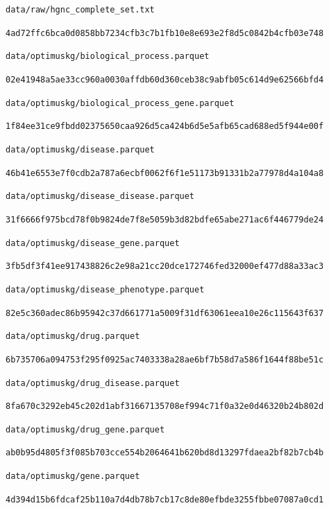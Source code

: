 \documentclass[10pt,a4paper]{article}
\begin{document}
\begingroup\footnotesize
\noindent\nolinkurl{data/raw/hgnc_complete_set.txt}\par
\noindent\texttt{4ad72ffc6bca0d0858bb7234cfb3c7b1fb10e8e693e2f8d5c0842b4cfb03e748}\par
\smallskip
\noindent\nolinkurl{data/optimuskg/biological_process.parquet}\par
\noindent\texttt{02e41948a5ae33cc960a0030affdb60d360ceb38c9abfb05c614d9e62566bfd4}\par
\smallskip
\noindent\nolinkurl{data/optimuskg/biological_process_gene.parquet}\par
\noindent\texttt{1f84ee31ce9fbdd02375650caa926d5ca424b6d5e5afb65cad688ed5f944e00f}\par
\smallskip
\noindent\nolinkurl{data/optimuskg/disease.parquet}\par
\noindent\texttt{46b41e6553e7f0cdb2a787a6ecbf0062f6f1e51173b91331b2a77978d4a104a8}\par
\smallskip
\noindent\nolinkurl{data/optimuskg/disease_disease.parquet}\par
\noindent\texttt{31f6666f975bcd78f0b9824de7f8e5059b3d82bdfe65abe271ac6f446779de24}\par
\smallskip
\noindent\nolinkurl{data/optimuskg/disease_gene.parquet}\par
\noindent\texttt{3fb5df3f41ee917438826c2e98a21cc20dce172746fed32000ef477d88a33ac3}\par
\smallskip
\noindent\nolinkurl{data/optimuskg/disease_phenotype.parquet}\par
\noindent\texttt{82e5c360adec86b95942c37d661771a5009f31df63061eea10e26c115643f637}\par
\smallskip
\noindent\nolinkurl{data/optimuskg/drug.parquet}\par
\noindent\texttt{6b735706a094753f295f0925ac7403338a28ae6bf7b58d7a586f1644f88be51c}\par
\smallskip
\noindent\nolinkurl{data/optimuskg/drug_disease.parquet}\par
\noindent\texttt{8fa670c3292eb45c202d1abf31667135708ef994c71f0a32e0d46320b24b802d}\par
\smallskip
\noindent\nolinkurl{data/optimuskg/drug_gene.parquet}\par
\noindent\texttt{ab0b95d4805f3f085b703cce554b2064641b620bd8d13297fdaea2bf82b7cb4b}\par
\smallskip
\noindent\nolinkurl{data/optimuskg/gene.parquet}\par
\noindent\texttt{4d394d15b6fdcaf25b110a7d4db78b7cb17c8de80efbde3255fbbe07087a0cd1}\par
\end{document}
